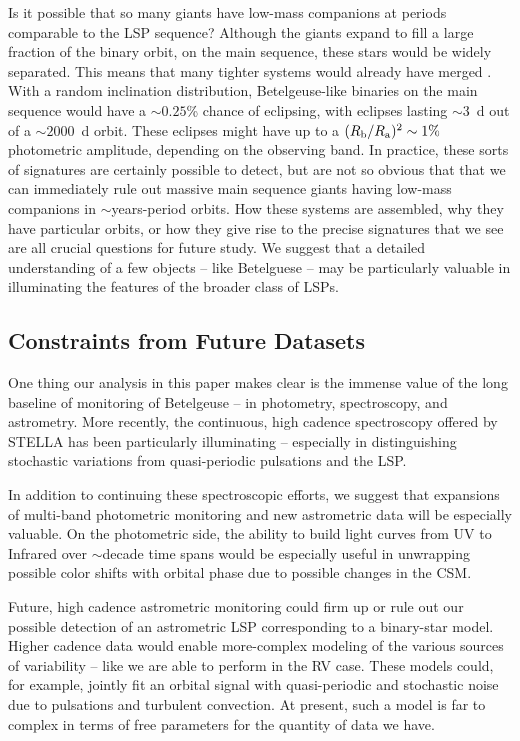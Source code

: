 \documentclass[twocolumn]{aastex631}
\begin{document}
Is it possible that so many giants have low-mass companions at periods comparable to the LSP sequence? 
Although the giants expand to fill a large fraction of the binary orbit, on the main sequence, these stars would be widely separated. This means that many tighter systems would already have merged \citep[e.g.][]{2020ApJ...900..118N}. With a random inclination distribution, Betelgeuse-like binaries on the main sequence would have a $\sim 0.25$\% chance of eclipsing, with eclipses lasting $\sim 3$~d out of a $\sim 2000$~d orbit. These eclipses might have up to a $(R_{\rm b}/R_{\rm a})^2 \sim 1\%$ photometric amplitude, depending on the observing band. In practice, these sorts of signatures are certainly possible to detect, but are not so obvious that that we can immediately rule out massive main sequence giants having low-mass companions in $\sim$years-period orbits.  How these systems are assembled, why they have particular orbits, or how they give rise to the precise signatures that we see are all crucial questions for future study.  We suggest that a detailed understanding of a few objects -- like Betelguese -- may be particularly valuable in  illuminating the features of the broader class of LSPs. 


\subsection{Constraints from Future Datasets}

One thing our analysis in this paper makes clear is the immense value of the long baseline of monitoring of Betelgeuse -- in photometry, spectroscopy, and astrometry. More recently, the continuous, high cadence spectroscopy offered by STELLA \citep{2022csss.confE.185G} has been particularly illuminating -- especially in distinguishing stochastic variations from quasi-periodic pulsations and the LSP. 

In addition to continuing these spectroscopic efforts, we suggest that expansions of multi-band photometric monitoring \citep[e.g.][]{2000PASP..112..977R,2022OEJV..233....1O,2022NatAs...6..930T} and new astrometric data will be especially valuable. On the photometric side, the ability to build light curves from UV to Infrared over $\sim$decade time spans would be especially useful in unwrapping possible color shifts with orbital phase due to possible changes in the CSM. 


Future, high cadence astrometric monitoring could firm up or rule out our possible detection of an astrometric LSP corresponding to a binary-star model. Higher cadence data would enable more-complex modeling of the various sources of variability -- like we are able to perform in the RV case. These models could, for example, jointly fit an orbital signal with quasi-periodic and stochastic noise due to pulsations and turbulent convection. At present, such a model is far to complex in terms of free parameters for the quantity of data we have. 
\end{document}
